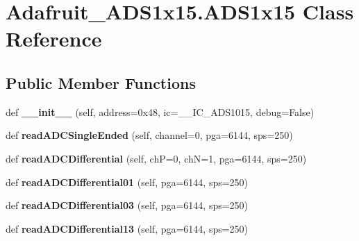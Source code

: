 \hypertarget{classAdafruit__ADS1x15_1_1ADS1x15}{}\section{Adafruit\+\_\+\+A\+D\+S1x15.\+A\+D\+S1x15 Class Reference}
\label{classAdafruit__ADS1x15_1_1ADS1x15}
\subsection*{Public Member Functions}
\begin{DoxyCompactItemize}
\item 
\mbox{\label{classAdafruit__ADS1x15_1_1ADS1x15_ab6d9568209c4374dc24c383349b66e68}} 
def {\bfseries \+\_\+\+\_\+init\+\_\+\+\_\+} (self, address=0x48, ic=\+\_\+\+\_\+\+I\+C\+\_\+\+A\+D\+S1015, debug=\+False)
\item 
\mbox{\label{classAdafruit__ADS1x15_1_1ADS1x15_ac1c098e7f21a694b3c35b0db5238281e}} 
def {\bfseries read\+A\+D\+C\+Single\+Ended} (self, channel=0, pga=6144, sps=250)
\item 
\mbox{\label{classAdafruit__ADS1x15_1_1ADS1x15_afd9615f62d7941fe1b0247da8cbf9e77}} 
def {\bfseries read\+A\+D\+C\+Differential} (self, chP=0, chN=1, pga=6144, sps=250)
\item 
\mbox{\label{classAdafruit__ADS1x15_1_1ADS1x15_ae2c037d4206153fe8efeaa345b8ad2fc}} 
def {\bfseries read\+A\+D\+C\+Differential01} (self, pga=6144, sps=250)
\item 
\mbox{\label{classAdafruit__ADS1x15_1_1ADS1x15_a185a5cd2c428e1a5c51281e9b611b4f6}} 
def {\bfseries read\+A\+D\+C\+Differential03} (self, pga=6144, sps=250)
\item 
\mbox{\label{classAdafruit__ADS1x15_1_1ADS1x15_a4045db9ebefb8410245a6b21989ce625}} 
def {\bfseries read\+A\+D\+C\+Differential13} (self, pga=6144, sps=250)
\item 
\mbox{\label{classAdafruit__ADS1x15_1_1ADS1x15_a990d6c45116b46442a5360475c0aa3a7}} 

\end{DoxyCompactItemize}
